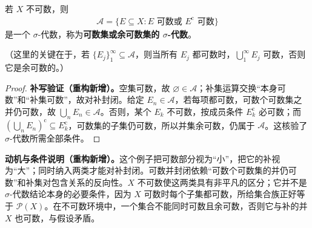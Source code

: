 \documentclass[../../main.tex]{subfiles}%
\begin{document}
\begin{definition}\label{definition:ch01-countable-cocountable-sigma}
若 $X$ 不可数，则
\begin{align*}
\mathscr{A}=\{E\subseteq X:E\text{ 可数或 }E^{\mathrm{c}}\text{ 可数}\}
\end{align*}
是一个 $\sigma$-代数，称为\textbf{可数集或余可数集的 $\sigma$-代数}。
\end{definition}

\begin{remark}
（这里的关键在于，若 $\{E_j\}_1^\infty\subseteq\mathscr{A}$，则当所有 $E_j$ 都可数时，$\bigcup_1^\infty E_j$ 可数，否则它是余可数的。）
\end{remark}
\begin{proof}
\textbf{补写验证（重构新增）。}空集可数，故 $\varnothing\in\mathscr{A}$；补集运算交换“本身可数”和“补集可数”，故对补封闭。给定 $E_n\in\mathscr{A}$，若每项都可数，可数个可数集之并仍可数，故 $\bigcup_nE_n\in\mathscr{A}$。否则，某个 $E_k$ 不可数，按成员条件 $E_k^{\mathrm c}$ 必可数；而 $(\bigcup_nE_n)^{\mathrm c}\subseteq E_k^{\mathrm c}$，可数集的子集仍可数，所以并集余可数，仍属于 $\mathscr{A}$。这核验了 $\sigma$-代数所需全部条件。
\end{proof}
\begin{remark}
\textbf{动机与条件说明（重构新增）。}这个例子把可数部分视为“小”，把它的补视为“大”；同时纳入两类才能对补封闭。可数并封闭依赖“可数个可数集的并仍可数”和补集对包含关系的反向性。$X$ 不可数使这两类具有非平凡的区分；它并不是 $\sigma$-代数结论本身的必要条件，因为 $X$ 可数时每个子集都可数，所给集合族正好等于 $\mathscr{P}(X)$。在不可数环境中，一个集合不能同时可数且余可数，否则它与补的并 $X$ 也可数，与假设矛盾。
\end{remark}
\end{document}
